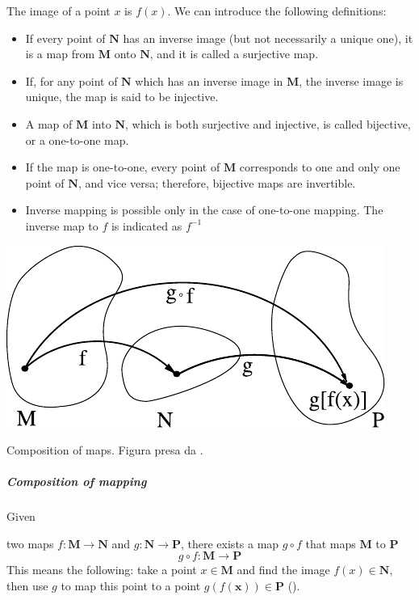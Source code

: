 \documentclass[../main.tex]{subfiles}
\begin{document}
The image of a point $x$ is $f(x)$. We can introduce the following definitions:
\begin{itemize}
    \item If every point of $\mathbf{N}$ has an inverse image (but not necessarily a unique one), it is a map from $\mathbf{M}$ onto $\mathbf{N}$, and it is called a surjective map.
    \item If, for any point of $\mathbf{N}$ which has an inverse image in $\mathbf{M}$, the inverse image is unique, the map is said to be injective.
    \item A map of $\mathbf{M}$ into $\mathbf{N}$, which is both surjective and injective, is called bijective, or a one-to-one map.
    \item If the map is one-to-one, every point of $\mathbf{M}$ corresponds to one and only one point of $\mathbf{N}$, and vice versa; therefore, bijective maps are invertible.
    \item Inverse mapping is possible only in the case of one-to-one mapping. The inverse map to $f$ is indicated as $f^{-1}$
\end{itemize}
\begin{marginfigure}[-20mm]
	\includegraphics{images/composizione_mappe.pdf}
	\caption[Composition of maps]{Composition of maps. Figura presa da \cite{ferrari2020general}.}
\end{marginfigure} 
\subparagraph{Composition of mapping}
\hypertarget{map-comp}{Given} two maps \(f : \mathbf{M} \to \mathbf{N}\) and \(g : \mathbf{N} \to \mathbf{P}\), there exists a map $g \circ f$ that maps $\mathbf{M}$ to $\mathbf{P}$
\[
g \circ f : \mathbf{M} \to \mathbf{P}
\]
This means the following: take a point $x \in \mathbf{M}$ and find the image $f(x) \in \mathbf{N}$, then use $g$ to map this point to a point $g(f(\mathbf{x})) \in \mathbf{P}$ ().
\end{document}
